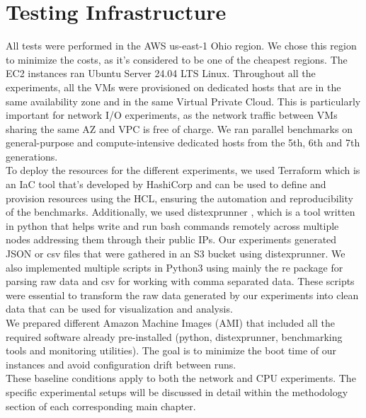 \chapter{Testing Infrastructure}\label{chapter:infra}
All tests were performed in the \ac{AWS} us-east-1 Ohio region. We chose this region to minimize 
the costs, as it's considered to be one of the cheapest regions. The EC2 instances ran Ubuntu Server 
24.04 LTS Linux. Throughout all the experiments,  all the VMs were provisioned on dedicated hosts that 
are in the same availability zone and in the same Virtual Private Cloud. This is particularly important 
for network I/O experiments, as the network traffic between VMs sharing the same AZ and VPC is free of 
charge. We ran parallel benchmarks on general-purpose and compute-intensive dedicated hosts from 
the 5th, 6th and 7th generations.\\
To deploy the resources for the different experiments, we used Terraform which is an \ac{IaC} tool 
that's developed by HashiCorp and can be used to define and provision resources using the \ac{HCL}, 
ensuring the automation and reproducibility of the benchmarks. 
Additionally, we used distexprunner \cite{distex}, which is a tool written in python 
that helps write and run bash commands remotely across multiple nodes addressing them through 
their public IPs. Our experiments generated JSON or csv files that were gathered in an S3 
bucket using distexprunner. We also implemented multiple scripts in Python3 using mainly the re 
package \cite{re} for parsing raw data and csv \cite{csv} for working with comma separated data.
These scripts were essential to transform the raw data generated by our experiments into clean data 
that can be used for visualization and analysis. \\
We prepared different Amazon Machine Images (AMI) that included all the  required 
software already pre-installed (python, distexprunner, benchmarking tools and monitoring utilities).
The goal is to minimize the boot time of our instances and avoid configuration drift between runs. \\
These baseline conditions apply to both the network and CPU experiments. The specific experimental 
setups will be discussed in detail within the methodology section of each corresponding main chapter.